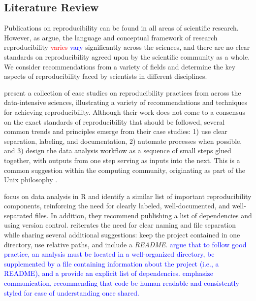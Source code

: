 \documentclass[APA,LATO1COL]{WileyNJD-v2}\usepackage[]{graphicx}\usepackage[]{color}
\newcommand{\R}{\textsf{R}\xspace}
\newcommand{\cmd}[1]{\textit{#1}}
\begin{document}
\subsection{Literature Review}\label{sec:papers}

Publications on reproducibility can be found in all areas of scientific research. However, as \citet{Goodman341ps12} argue, the language and conceptual framework of research reproducibility \textcolor{red}{\st{varies}} \textcolor{blue}{vary} significantly across the sciences, and there are no clear standards on reproducibility agreed upon by the scientific community as a whole. We consider recommendations from a variety of fields and determine the key aspects of reproducibility faced by scientists in different disciplines. 

\citet{kitzes2017practice} present a collection of case studies on reproducibility practices from across the data-intensive sciences, illustrating a variety of recommendations and techniques for achieving reproducibility. Although their work does not come to a consensus on the exact standards of reproducibility that should be followed, several common trends and principles emerge from their case studies: 1) use clear separation, labeling, and documentation, 2) automate processes when possible, and 3) design the data analysis workflow as a sequence of small steps glued together, with outputs from one step serving as inputs into the next. This is a common suggestion within the computing community, originating as part of the Unix philosophy \citep{unix}.

\citet{cooper2017guide} focus on data analysis in \R and identify a similar list of important reproducibility components, reinforcing the need for clearly labeled, well-documented, and well-separated files. In addition, they recommend publishing a list of dependencies and using version control. 
\citet{broman} reiterates the need for clear naming and file separation while sharing several additional suggestions: keep the project contained in one directory, use relative paths, and include a \cmd{README}.
\textcolor{blue}{\citet{wilson2017good} argue that to follow good practice, an analysis must be located in a well-organized directory, be supplemented by a file containing information about the project (i.e., a README), and a provide an explicit list of dependencies.}
\textcolor{blue}{{\citet{wilson2014best}} emphasize communication, recommending that code be human-readable and consistently styled for ease of understanding once shared.}
\end{document}

